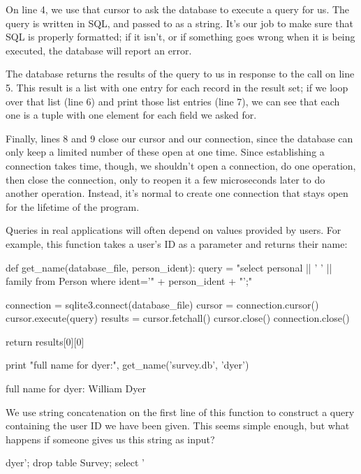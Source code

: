 On line 4, we use that cursor to ask the database to execute a query for
us. The query is written in SQL, and passed to 
as a string. It's our job to make sure that SQL is properly formatted;
if it isn't, or if something goes wrong when it is being executed, the
database will report an error.

The database returns the results of the query to us in response to the
 call on line 5. This result is a list with one
entry for each record in the result set; if we loop over that list (line
6) and print those list entries (line 7), we can see that each one is a
tuple with one element for each field we asked for.

Finally, lines 8 and 9 close our cursor and our connection, since the
database can only keep a limited number of these open at one time. Since
establishing a connection takes time, though, we shouldn't open a
connection, do one operation, then close the connection, only to reopen
it a few microseconds later to do another operation. Instead, it's
normal to create one connection that stays open for the lifetime of the
program.

Queries in real applications will often depend on values provided by
users. For example, this function takes a user's ID as a parameter and
returns their name:

\begin{VerbIn}
def get_name(database_file, person_ident):
    query = "select personal || ' ' || family from Person where ident='" + person_ident + "';"

    connection = sqlite3.connect(database_file)
    cursor = connection.cursor()
    cursor.execute(query)
    results = cursor.fetchall()
    cursor.close()
    connection.close()

    return results[0][0]

print "full name for dyer:", get_name('survey.db', 'dyer')
\end{VerbIn}

\begin{VerbOut}
full name for dyer: William Dyer
\end{VerbOut}

We use string concatenation on the first line of this function to
construct a query containing the user ID we have been given. This seems
simple enough, but what happens if someone gives us this string as
input?

\begin{VerbOut}
dyer'; drop table Survey; select '
\end{VerbOut}

